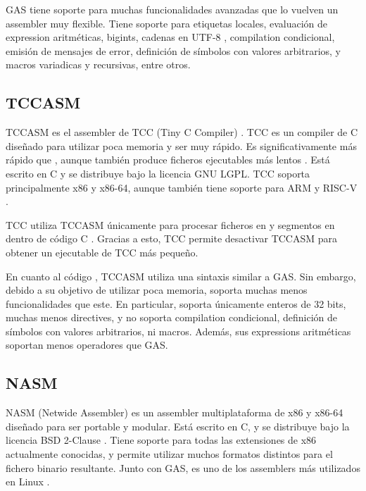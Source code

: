 GAS tiene soporte para muchas funcionalidades avanzadas que lo vuelven un
\gls{assembler} muy flexible. Tiene soporte para etiquetas locales, evaluación
de \gls{expression} aritméticas, \glspl{bigint}, cadenas en UTF-8
\parencite{UTF-8}, \gls{compilation} condicional, emisión de mensajes de error,
definición de símbolos con valores arbitrarios, y macros variadicas y
recursivas, entre otros.

\subsection{TCCASM}

TCCASM es el \gls{assembler} de TCC (Tiny C Compiler) \parencite{tcc}. TCC es un
\gls{compiler} de C diseñado para utilizar poca memoria y ser muy rápido. Es
significativamente más rápido  que
, aunque también produce ficheros ejecutables más lentos
\parencite{tcc-speed}. Está escrito en C y se distribuye bajo la licencia GNU
LGPL. TCC soporta principalmente x86 y x86-64, aunque también tiene soporte para
ARM y RISC-V \parencite{tcc-manual} \parencite{tcc-arm} \parencite{tcc-riscv}.

TCC utiliza TCCASM únicamente para procesar ficheros en
 y segmentos en 
dentro de código C \parencite{tcc-manual}. Gracias a esto, TCC permite
desactivar TCCASM para obtener un ejecutable de TCC más pequeño.

En cuanto al código , TCCASM utiliza una sintaxis
similar a GAS. Sin embargo, debido a su objetivo de utilizar poca memoria,
soporta muchas menos funcionalidades que este. En particular, soporta únicamente
enteros de 32 bits, muchas menos \glspl{directive}, y no soporta
\gls{compilation} condicional, definición de símbolos con valores arbitrarios,
ni macros. Además, sus \glspl{expression} aritméticas soportan menos operadores
que GAS.

\subsection{NASM}

NASM (Netwide Assembler) \parencite{NASM} es un \gls{assembler} multiplataforma
de x86 y x86-64 diseñado para ser portable y modular. Está escrito en C, y se
distribuye bajo la licencia BSD 2-Clause \parencite{bsd-2c}. Tiene soporte para
todas las extensiones de x86 actualmente conocidas, y permite utilizar muchos
formatos distintos para el fichero binario resultante. Junto con GAS, es uno de
los \glspl{assembler} más utilizados en Linux \parencite{assembler-usage}.

